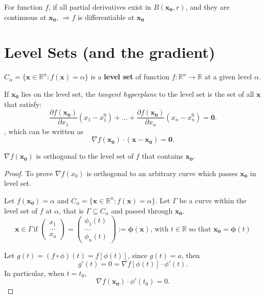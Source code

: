 \begin{proposition}
    For function $f$, if all partial derivatives exist in $B(\mathbf{x_0},r)$, and they are continuous at $\mathbf{x_0}$, $\Longrightarrow f$ is differentiable at $\mathbf{x_0}$
\end{proposition}

\section{Level Sets (and the gradient)}


\begin{definition}
    $C_\alpha = \{\mathbf{x} \in \mathbb{R}^{n}: f(\mathbf{x}) = \alpha\}$ is a \textbf{level set} of function $f: \mathbb{R}^{n} \to \mathbb{R}$ at a given level $\alpha$.
\end{definition}

If $\mathbf{x_0}$ lies on the level set, the \textit{tangent hyperplane} to the level set is the set of all $\mathbf{x}$ that satisfy: \[
    \frac{\partial f(\mathbf{x_0})}{\partial x_1}(x_1-x_1 ^{0}) + \dots+ \frac{\partial f(\mathbf{x_0})}{\partial x_n}(x_n-x_n ^{0}) = \mathbf{0}.
\]
, which can be written as \[
    \nabla f(\mathbf{x_0}) \cdot (\mathbf{x - x_0}) = \mathbf{0}.
\]

\begin{proposition}
    $\nabla f(\mathbf{x_0})$ is orthogonal to the level set of $f$ that contains $\mathbf{x_0}$.
\end{proposition}

\begin{proof}
    To prove $\nabla f(x_0)$ is orthogonal to an arbitrary curve which passes $\mathbf{x_0}$ in level set.

    Let $f(\mathbf{x_0}) = \alpha$ and $C_\alpha = \{\mathbf{x} \in \mathbb{R}^{n}: f(\mathbf{x}) = \alpha\}$. Let $\Gamma$ be a curve within the level set of $f$ at $\alpha$, that is $\Gamma \subseteq C_\alpha$ and passed through $\mathbf{x_0}$. \[
        \mathbf{x} \in \Gamma \, \text{if } \begin{pmatrix}
            x_1 \\ \dots \\ x_n
        \end{pmatrix} = \begin{pmatrix}
            \phi_1(t) \\ \dots \\ \phi_n(t)
        \end{pmatrix} := \boldsymbol{\phi}(\mathbf{x}), \, \text{with } t \in \mathbb{R} \text{ so that } \mathbf{x_0} = \boldsymbol{\phi}(t)
    \]

    Let $g(t) = (f \circ \phi )(t) = f[\phi (t)]$, since $g(t) = a$, then \[
        g'(t) = 0 = \nabla f[\phi (t)] \cdot \phi' (t).
    \]
    In particular, when $t=t_0$, \[
        \nabla f(\mathbf{x_0}) \cdot \phi'(t_0) = 0.
    \]
\end{proof}

